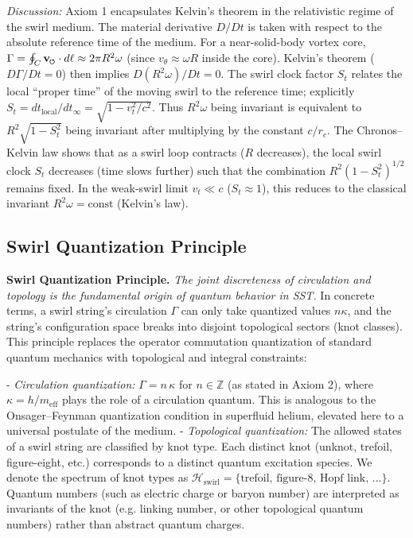 \documentclass[reprint,aps,onecolumn,nofootinbib]{revtex4-2}
\newcommand{\swirlarrow}{%
    \mathchoice{\mkern-2mu\scriptstyle\boldsymbol{\circlearrowleft}}%
    {\mkern-2mu\scriptstyle\boldsymbol{\circlearrowleft}}%
    {\mkern-2mu\scriptscriptstyle\boldsymbol{\circlearrowleft}}%
    {\mkern-2mu\scriptscriptstyle\boldsymbol{\circlearrowleft}}%
}
\newcommand{\vswirl}{\mathbf{v}_{\swirlarrow}}
\begin{document}
	\noindent \textit{Discussion:} Axiom 1 encapsulates Kelvin’s theorem in the relativistic regime of the swirl medium. The material derivative $D/Dt$ is taken with respect to the absolute reference time of the medium. For a near-solid-body vortex core, $\Gamma = \oint_C \vswirl\cdot d\ell \approx 2\pi R^2 \omega$ (since $v_{\theta}\approx \omega R$ inside the core). Kelvin’s theorem ($D\Gamma/Dt=0$) then implies $D(R^2 \omega)/Dt=0$. The swirl clock factor $S_t$ relates the local “proper time” of the moving swirl to the reference time; explicitly $S_t = dt_{\text{local}}/dt_{\infty} = \sqrt{1 - v_t^2/c^2}$. Thus $R^2 \omega$ being invariant is equivalent to $R^2 \sqrt{1 - S_t^2}$ being invariant after multiplying by the constant $c/r_c$. The Chronos–Kelvin law shows that as a swirl loop contracts ($R$ decreases), the local swirl clock $S_t$ decreases (time slows further) such that the combination $R^2 (1-S_t^2)^{1/2}$ remains fixed. In the weak-swirl limit $v_t \ll c$ ($S_t\approx 1$), this reduces to the classical invariant $R^2 \omega = \text{const}$ (Kelvin’s law).


	\subsection*{Swirl Quantization Principle}
	\textbf{Swirl Quantization Principle.} \emph{The joint discreteness of circulation and topology is the fundamental origin of quantum behavior in SST.} In concrete terms, a swirl string’s circulation $\Gamma$ can only take quantized values $n\kappa$, and the string’s configuration space breaks into disjoint topological sectors (knot classes). This principle replaces the operator commutation quantization of standard quantum mechanics with topological and integral constraints:

	- \emph{Circulation quantization:} $\Gamma = n\,\kappa$ for $n\in\mathbb{Z}$ (as stated in Axiom 2), where $\kappa = h/m_{\text{eff}}$ plays the role of a circulation quantum. This is analogous to the Onsager–Feynman quantization condition in superfluid helium, elevated here to a universal postulate of the medium.
	- \emph{Topological quantization:} The allowed states of a swirl string are classified by knot type. Each distinct knot (unknot, trefoil, figure-eight, etc.) corresponds to a distinct quantum excitation species. We denote the spectrum of knot types as $\mathcal{H}_{\text{swirl}} = \{\text{trefoil, figure-8, Hopf link, ...}\}$. Quantum numbers (such as electric charge or baryon number) are interpreted as invariants of the knot (e.g. linking number, or other topological quantum numbers) rather than abstract quantum charges.
\end{document}
